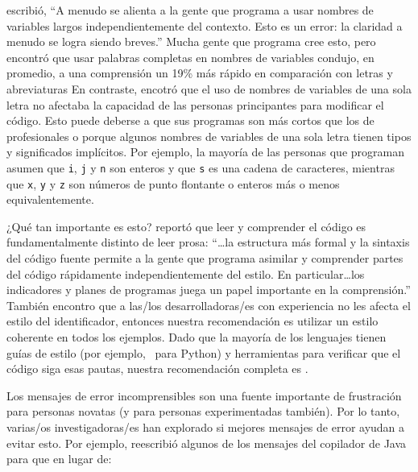 \cite{Kern1999} escribió,
``A menudo se alienta a la gente que programa a usar nombres de variables largos independientemente del contexto.
Esto es un error: la claridad a menudo se logra siendo breves.''
Mucha gente que programa cree esto,
pero \cite{Hofm2017} encontró que usar palabras completas en nombres de variables
 condujo, en promedio, a una comprensión un 19\% más rápido en comparación con letras y abreviaturas
En contraste,
\cite{Beni2017} encotró que el uso de nombres de variables de una sola letra no afectaba la capacidad de las personas principantes para modificar el código.
Esto puede deberse a que sus programas son más cortos que los de profesionales
o porque algunos nombres de variables de una sola letra tienen tipos y significados implícitos.
Por ejemplo,
la mayoría de las personas que programan asumen que \texttt{i}, \texttt{j} y \texttt{n} son enteros
y que \texttt{s} es una cadena de caracteres,
mientras que \texttt{x}, \texttt{y} y \texttt{z} son números de punto flontante o enteros
más o menos equivalentemente.

¿Qué tan importante es esto?
\cite{Bink2012} reportó que leer y comprender el código es fundamentalmente distinto de leer prosa:
``{\ldots}la estructura más formal y la sintaxis del código fuente
permite a la gente que programa asimilar y comprender partes del código rápidamente independientemente del estilo.
En particular{\ldots}los indicadores y planes de programas juega un papel importante en la comprensión.''
También encontro que a las/los desarrolladoras/es con experiencia no les afecta el estilo del identificador,
entonces nuestra recomendación es utilizar un estilo coherente en todos los ejemplos.
Dado que la mayoría de los lenguajes tienen guías de estilo
(por ejemplo,\  para Python)
y herramientas para verificar que el código siga esas pautas,
nuestra recomendación completa es
.


Los mensajes de error incomprensibles son una fuente importante de frustración para personas novatas
(y para personas experimentadas también).
Por lo tanto, varias/os investigadoras/es han explorado si mejores mensajes de error ayudan a evitar esto.
Por ejemplo,
\cite{Beck2016} reescribió algunos de los mensajes del copilador de Java para que en lugar de:

